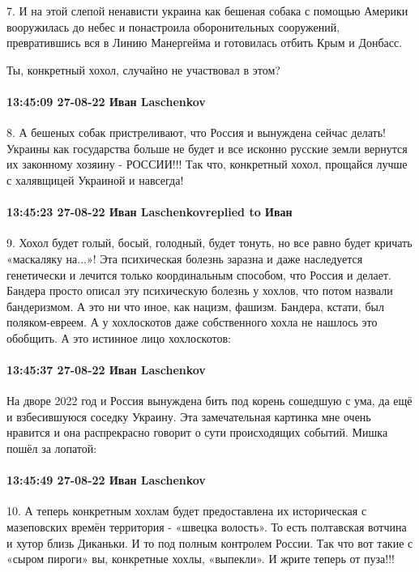 7. И на этой слепой ненависти украина как бешеная собака с помощью Америки
вооружилась до небес и понастроила оборонительных сооружений, превратившись вся
в Линию Манергейма и готовилась отбить Крым и Донбасс.

Ты, конкретный хохол, случайно не участвовал в этом?

\paragraph{13:45:09 27-08-22 Иван Laschenkov}

8. А бешеных собак пристреливают, что Россия и вынуждена сейчас делать! Украины как государства больше не будет и все исконно русские земли вернутся их законному хозяину - РОССИИ!!!
Так что, конкретный хохол, прощайся лучше с халявщицей Украиной и навсегда!

\paragraph{13:45:23 27-08-22 Иван Laschenkovreplied to Иван}

9. Хохол будет голый, босый, голодный, будет тонуть, но все равно будет кричать «маскаляку на...»! Эта психическая болезнь заразна и даже наследуется генетически и лечится только координальным способом, что Россия и делает.
Бандера просто описал эту психическую болезнь у хохлов, что потом назвали бандеризмом. А это ни что иное, как нацизм, фашизм. Бандера, кстати, был поляком-евреем. А у хохлоскотов даже собственного хохла не нашлось это обобщить.
А это истинное лицо хохлоскотов:

\paragraph{13:45:37 27-08-22 Иван Laschenkov}

На дворе 2022 год и Россия вынуждена бить под корень сошедшую с ума, да ещё и взбесившуюся соседку Украину. Эта замечательная картинка мне очень нравится и она распрекрасно говорит о сути происходящих событий.
Мишка пошёл за лопатой:

\paragraph{13:45:49 27-08-22 Иван Laschenkov}

10. А теперь конкретным хохлам будет предоставлена их историческая с мазеповских времён территория - «швецка волость». То есть полтавская вотчина и хутор близь Диканьки. И то под полным контролем России.
Так что вот такие с «сыром пироги» вы, конкретные хохлы, «выпекли». И жрите теперь от пуза!!!


